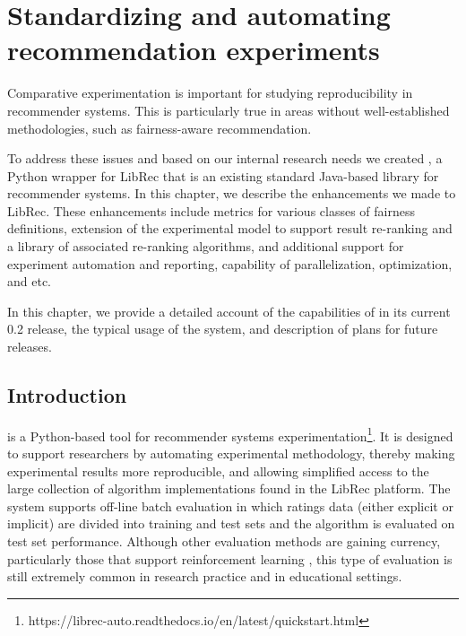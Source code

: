 
\chapter{Standardizing and automating recommendation experiments}
\label{ch:librec-auto}

Comparative experimentation is important for studying reproducibility in recommender systems. This is particularly true in areas without well-established methodologies, such as fairness-aware recommendation. 

To address these issues and based on our internal research needs we created \libauto{}, a Python wrapper for LibRec that is an existing standard Java-based library for recommender systems. In this chapter, we describe the enhancements we made to LibRec. These enhancements include metrics for various classes of fairness definitions, extension of the experimental model to support result re-ranking and a library of associated re-ranking algorithms, and additional support for experiment automation and reporting, capability of parallelization, optimization, and etc.


In this chapter, we provide a detailed account of the capabilities of \libauto{} in its current 0.2 release, the typical usage of the system, and description of plans for future releases.


\section{Introduction}
\label{sec:librec_intro}

\libauto{} is a Python-based tool for recommender systems experimentation\footnote{https://librec-auto.readthedocs.io/en/latest/quickstart.html}. It is designed to support researchers by automating experimental methodology, thereby making experimental results more reproducible, and allowing simplified access to the large collection of algorithm implementations found in the LibRec platform. The system supports off-line batch evaluation in which ratings data (either explicit or implicit) are divided into training and test sets and the algorithm is evaluated on test set performance. Although other evaluation methods are gaining currency, particularly those that support reinforcement learning \cite{joachims2018reveal,joachims2019reveal,joachims2020reveal}, this type of evaluation is still extremely common in research practice and in educational settings. 

